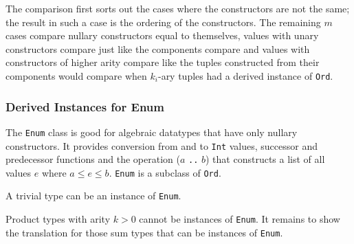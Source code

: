 The comparison first sorts out the cases where the constructors are not the same; the result in such a case is the ordering of the constructors. The remaining $m$ cases compare nullary constructors equal to themselves, values with unary constructors compare just like the components compare and values with constructors of higher arity compare like the tuples constructed from their components would compare when $k_i$-ary tuples had a derived instance of \texttt{Ord}.

\subsubsection{Derived Instances for Enum}

The \texttt{Enum} class is good for algebraic datatypes that have only nullary constructors.
It provides conversion from and to \texttt{Int} values, successor and predecessor functions and the operation ($a$ \texttt{..} $b$) that constructs a list of all values $e$ where $a \le e \le b$. \texttt{Enum} is a subclass of \texttt{Ord}.

A trivial type can be an instance of \texttt{Enum}.

Product types with arity $k>0$ cannot be instances of \texttt{Enum}. It remains to show the translation for those sum types that can be instances of \texttt{Enum}.

